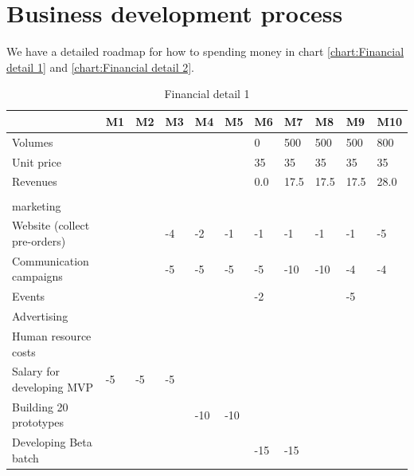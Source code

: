 \documentclass[12pt,twoside]{article}
\begin{document}
\section{Business development process}
\label{sec:Business development process}
We have a detailed roadmap for how to spending money in chart \ref{chart:Financial detail 1} and \ref{chart:Financial detail 2}. 
\begin{table}[]
    \caption{Financial detail 1}
    \begin{tabular}{|l|l|l|l|l|l|l|l|l|l|l|}
        \hline
                                 & M1  & M2  & M3  & M4  & M5  & M6   & M7   & M8   & M9   & M10   \\ \hline 
    Volumes                      &     &     &     &     &     & 0    & 500  & 500  & 500  & 800   \\ \hline
    Unit price                   &     &     &     &     &     & 35   & 35   & 35   & 35   & 35    \\ \hline
    Revenues                     &     &     &     &     &     & 0.0  & 17.5 & 17.5 & 17.5 & 28.0  \\ \hline
                                 &     &     &     &     &     &      &      &      &      &      \\ \hline
    marketing                    &     &     &     &     &     &      &      &      &      &      \\ \hline
    Website (collect pre-orders) &     &     & -4  & -2  & -1  & -1   & -1   & -1   & -1   & -5   \\ \hline
    Communication campaigns      &     &     & -5  & -5  & -5  & -5   & -10  & -10  & -4   & -4   \\ \hline
    Events                       &     &     &     &     &     & -2   &      &      & -5   &      \\ \hline
    Advertising                  &     &     &     &     &     &      &      &      &      &      \\ \hline
    Human resource costs         &     &     &     &     &     &      &      &      &      &      \\ \hline
    Salary for developing MVP    & -5  & -5  & -5  &     &     &      &      &      &      &      \\ \hline
    Building 20 prototypes       &     &     &     & -10 & -10 &      &      &      &      &      \\ \hline
    Developing Beta batch        &     &     &     &     &     & -15  & -15  &      &      &      \\ \hline

\end{tabular}
\end{table}
\end{document}
